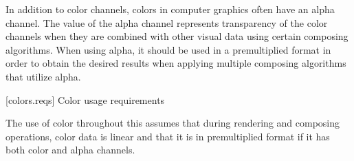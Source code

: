 \pnum
In addition to color channels, colors in computer graphics often have an alpha channel. The value of the alpha channel represents transparency of the color channels when they are combined with other visual data using certain composing algorithms. When using alpha, it should be used in a premultiplied format in order to obtain the desired results when applying multiple composing algorithms that utilize alpha.

 [colors.reqs] {Color usage requirements}

\pnum
The use of color throughout this \documenttypename assumes that during rendering and composing operations, color data is linear and that it is in premultiplied format if it has both color and alpha channels.

\addtocounter{SectionDepthBase}{1}


\addtocounter{SectionDepthBase}{-1}
